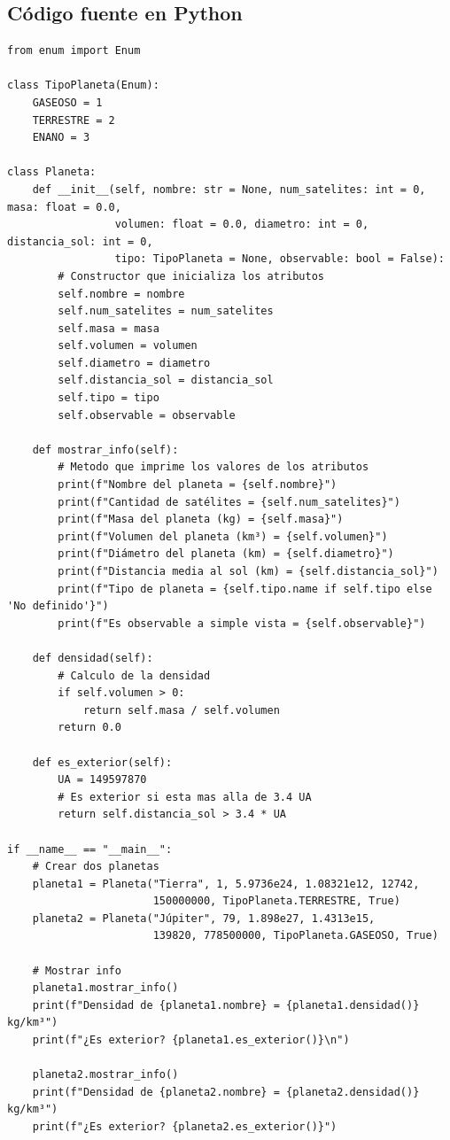 \documentclass[11pt,a4paper]{article}
\begin{document}
\subsection{Código fuente en Python}
\begin{lstlisting}[caption={Implementación de la clase Planeta y enumeración TipoPlaneta (\texttt{Actividad2\_Ejercicio2\_2.py})}]
from enum import Enum

class TipoPlaneta(Enum):
    GASEOSO = 1
    TERRESTRE = 2
    ENANO = 3

class Planeta:
    def __init__(self, nombre: str = None, num_satelites: int = 0, masa: float = 0.0,
                 volumen: float = 0.0, diametro: int = 0, distancia_sol: int = 0,
                 tipo: TipoPlaneta = None, observable: bool = False):
        # Constructor que inicializa los atributos
        self.nombre = nombre
        self.num_satelites = num_satelites
        self.masa = masa
        self.volumen = volumen
        self.diametro = diametro
        self.distancia_sol = distancia_sol
        self.tipo = tipo
        self.observable = observable

    def mostrar_info(self):
        # Metodo que imprime los valores de los atributos
        print(f"Nombre del planeta = {self.nombre}")
        print(f"Cantidad de satélites = {self.num_satelites}")
        print(f"Masa del planeta (kg) = {self.masa}")
        print(f"Volumen del planeta (km³) = {self.volumen}")
        print(f"Diámetro del planeta (km) = {self.diametro}")
        print(f"Distancia media al sol (km) = {self.distancia_sol}")
        print(f"Tipo de planeta = {self.tipo.name if self.tipo else 'No definido'}")
        print(f"Es observable a simple vista = {self.observable}")

    def densidad(self):
        # Calculo de la densidad
        if self.volumen > 0:
            return self.masa / self.volumen
        return 0.0

    def es_exterior(self):
        UA = 149597870
        # Es exterior si esta mas alla de 3.4 UA
        return self.distancia_sol > 3.4 * UA

if __name__ == "__main__":
    # Crear dos planetas
    planeta1 = Planeta("Tierra", 1, 5.9736e24, 1.08321e12, 12742,
                       150000000, TipoPlaneta.TERRESTRE, True)
    planeta2 = Planeta("Júpiter", 79, 1.898e27, 1.4313e15,
                       139820, 778500000, TipoPlaneta.GASEOSO, True)

    # Mostrar info
    planeta1.mostrar_info()
    print(f"Densidad de {planeta1.nombre} = {planeta1.densidad()} kg/km³")
    print(f"¿Es exterior? {planeta1.es_exterior()}\n")

    planeta2.mostrar_info()
    print(f"Densidad de {planeta2.nombre} = {planeta2.densidad()} kg/km³")
    print(f"¿Es exterior? {planeta2.es_exterior()}")
\end{lstlisting}
\end{document}
